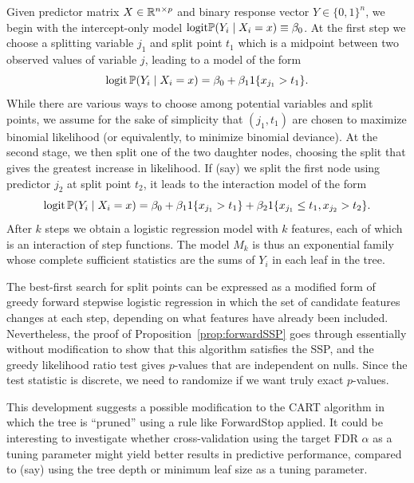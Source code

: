 \documentclass{article}
\begin{document}
Given predictor matrix $X \in \mathbb{R}^{n\times p}$ and binary response vector $Y\in \{0,1\}^n$, we begin with the intercept-only model $\textrm{logit} \mathbb{P}(Y_i \mid X_i = x) \equiv \beta_0$. At the first step we choose a splitting variable $j_1$ and split point $t_1$ which is a midpoint between two observed values of variable $j$, leading to a model of the form
\begin{equation*}
\textrm{logit} \,\mathbb{P}(Y_i \mid X_i=x) = \beta_0 + \beta_{1} 1\{x_{j_1} > t_1\}.
\end{equation*}
While there are various ways to choose among potential variables and split points, we assume for the sake of simplicity that $(j_1,t_1)$ are chosen to maximize binomial likelihood (or equivalently, to minimize binomial deviance). At the second stage, we then split one of the two daughter nodes, choosing the split that gives the greatest increase in likelihood. If (say) we split the first node using predictor $j_2$ at split point $t_2$, it leads to the interaction model of the form
\begin{equation}
\textrm{logit} \,\mathbb{P}(Y_i \mid X_i=x) = \beta_0 + \beta_{1} 1\{x_{j_1} > t_1\} + \beta_2 1\{x_{j_1} \leq t_1, x_{j_2} > t_2\}.
\label{eqn:intmodel}
\end{equation}
After $k$ steps we obtain a logistic regression model with $k$ features, each of which is an interaction of step functions. The model $M_k$ is thus an exponential family whose complete sufficient statistics are the sums of $Y_i$ in each leaf in the tree.

The best-first search for split points can be expressed as a modified form of greedy forward stepwise logistic regression in which the set of candidate features changes at each step, depending on what features have already been included. Nevertheless, the proof of Proposition~\ref{prop:forwardSSP} goes through essentially without modification to show that this algorithm satisfies the SSP, and the greedy likelihood ratio test gives $p$-values that are independent on nulls. Since the test statistic is discrete, we need to randomize if we want truly exact $p$-values. 

This development suggests a possible modification to the CART algorithm in which the tree is ``pruned'' using a rule like ForwardStop applied. It could be interesting to investigate whether cross-validation using the target FDR $\alpha$ as a tuning parameter might yield better results in predictive performance, compared to (say) using the tree depth or minimum leaf size as a tuning parameter.
\end{document}
